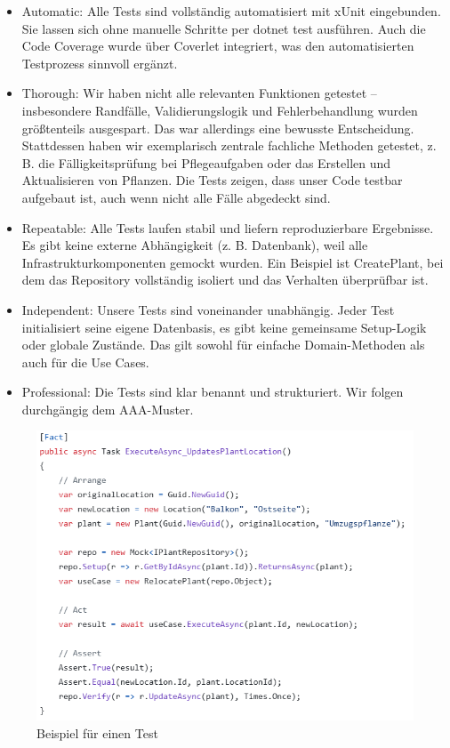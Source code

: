 \begin{itemize}
    \item Automatic: Alle Tests sind vollständig automatisiert mit xUnit eingebunden. Sie lassen sich ohne manuelle Schritte per dotnet test ausführen.
Auch die Code Coverage wurde über Coverlet integriert, was den automatisierten Testprozess sinnvoll ergänzt.
    \item Thorough: Wir haben nicht alle relevanten Funktionen getestet – insbesondere Randfälle, Validierungslogik und Fehlerbehandlung wurden
größtenteils ausgespart. Das war allerdings eine bewusste Entscheidung. Stattdessen haben wir exemplarisch zentrale fachliche Methoden getestet,
z. B. die Fälligkeitsprüfung bei Pflegeaufgaben oder das Erstellen und Aktualisieren von Pflanzen. Die Tests zeigen, dass unser Code testbar
aufgebaut ist, auch wenn nicht alle Fälle abgedeckt sind.
    \item Repeatable: Alle Tests laufen stabil und liefern reproduzierbare Ergebnisse. Es gibt keine externe Abhängigkeit (z. B. Datenbank), weil alle
Infrastrukturkomponenten gemockt wurden. Ein Beispiel ist CreatePlant, bei dem das Repository vollständig isoliert und das Verhalten überprüfbar
ist.
    \item Independent: Unsere Tests sind voneinander unabhängig. Jeder Test initialisiert seine eigene Datenbasis, es gibt keine gemeinsame Setup-Logik
oder globale Zustände. Das gilt sowohl für einfache Domain-Methoden als auch für die Use Cases.
    \item Professional: Die Tests sind klar benannt und strukturiert. Wir folgen durchgängig dem AAA-Muster.
\end{itemize}

\begin{figure}[H]
\centering
\includegraphics[width=1.00\textwidth]{img/test.png}
\caption{Beispiel für einen Test}
\end{figure}